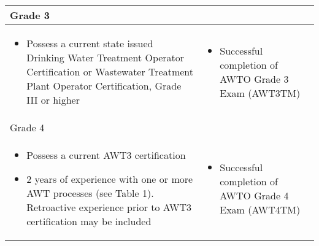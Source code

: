 \begin{table}[H]
\captionsetup{justification=centering}
\scriptsize
\begin{tabularx}{\textwidth}{| X | X |}

\hline
\multicolumn{2}{|l|}{Grade 3}                                                                                                                                                                                                                                                                                                                                                                                                   \\
\hline
\begin{itemize}
\item Possess a current state issued Drinking Water Treatment Operator Certification or Wastewater Treatment Plant   Operator Certification, Grade III or higher                                                                                                                                                                                             
\end{itemize} & 
\begin{itemize}
\item Successful completion of AWTO Grade 3 Exam (AWT3TM)
\end{itemize} \\
\hline
\multicolumn{2}{|l|}{Grade 4}                                                                                                                                                                                                                                                                                                                                                                                                   \\
\hline
\begin{itemize}
\item Possess a current AWT3 certification
\item 2 years of   experience with one or more AWT processes (see Table 1). Retroactive   experience prior to AWT3 certification may be included 
\end{itemize}
& 
\begin{itemize}
\item Successful   completion of AWTO Grade 4 Exam (AWT4TM) 

\end{itemize}
\end{tabularx}
\end{table}
